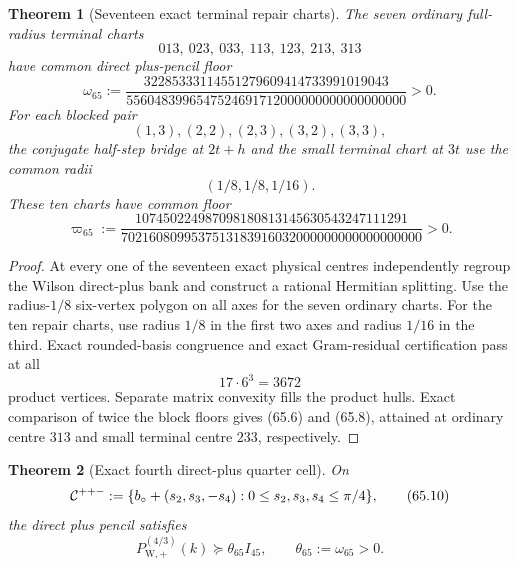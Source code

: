 \documentclass[11pt,oneside]{article}
\newtheorem{theorem}{Theorem}[section]
\theoremstyle{definition}
\theoremstyle{remark}
\begin{document}
\begin{theorem}[Seventeen exact terminal repair charts]
\label{thm:newv65-seventeen-charts}
The seven ordinary full-radius terminal charts
\[
 013,\ 023,\ 033,\ 113,\ 123,\ 213,\ 313             \tag{65.5}
\]
have common direct plus-pencil floor
\[
 \omega_{65}:=
 \frac{32285333114551279609414733991019043}
 {5560483996547524691712000000000000000000}>0.        \tag{65.6}
\]
For each blocked pair
\[
 (1,3),(2,2),(2,3),(3,2),(3,3),                     \tag{65.7}
\]
the conjugate half-step bridge at \(2t+h\) and the small terminal
chart at \(3t\) use the common radii
\[
 (1/8,1/8,1/16).
\]
These ten charts have common floor
\[
 \varpi_{65}:=
 \frac{107450224987098180813145630543247111291}
 {7021608099537513183916032000000000000000000}>0.    \tag{65.8}
\]
\end{theorem}

\begin{proof}
At every one of the seventeen exact physical centres independently
regroup the Wilson direct-plus bank and construct a rational
Hermitian splitting.  Use the radius-\(1/8\) six-vertex polygon on
all axes for the seven ordinary charts.  For the ten repair charts,
use radius \(1/8\) in the first two axes and radius \(1/16\) in the
third.  Exact rounded-basis congruence and exact Gram-residual
certification pass at all
\[
 17\cdot6^3=3672                                      \tag{65.9}
\]
product vertices.  Separate matrix convexity fills the product
hulls.  Exact comparison of twice the block floors gives (65.6)
and (65.8), attained at ordinary centre \(313\) and small terminal
centre \(233\), respectively.
\end{proof}

\begin{theorem}[Exact fourth direct-plus quarter cell]
\label{thm:newv65-fourth-cell}
On
\[
 {\cal C}^{++-}:=
 \{b_\circ+(s_2,s_3,-s_4):
       0\le s_2,s_3,s_4\le\pi/4\},                   \tag{65.10}
\]
the direct plus pencil satisfies
\[
 P_{\mathrm W,+}^{(4/3)}(k)
 \succeq\theta_{65}I_{45},\qquad
 \theta_{65}:=\omega_{65}>0.                         \tag{65.11}
\]
\end{theorem}
\end{document}
